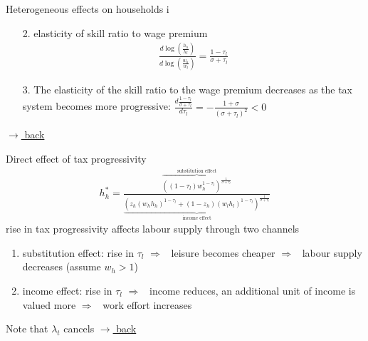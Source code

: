 \documentclass[11pt,aspectratio=169]{beamer}
\newcommand{\ar}{$\Rightarrow$ \ }
\begin{document}
\begin{frame}{Heterogeneous effects on households i}

	\begin{enumerate}
		\item[2.] elasticity of skill ratio to wage premium
		\begin{align*}
		\frac{d\log\left(\frac{h_h}{h_l}\right)}{d\log\left(\frac{w_h}{w_l}\right)}=\frac{1-\tau_l}{\sigma +\tau_l}
		\end{align*}
		\item[3.]
		The elasticity of the skill ratio to the wage premium decreases as the tax system becomes more progressive: $\frac{d\frac{1-\tau_l}{\sigma+\tau_l}}{d \tau_l}=-\frac{1+\sigma}{(\sigma+\tau_l)^2}<0$
	\end{enumerate}
\vspace{0mm}
\hfill
\hyperlink{backhh}{\tiny{$\rightarrow$ back}}
\end{frame}
\begin{frame}[shrink]{Direct effect of tax progressivity}	\hypertarget{opth}{}
\vspace{-9mm}
\begin{align*}
h_h^*=\frac{\overbrace{\left((1-\tau_l)w_h^{1-\tau_l}\right)^{\frac{1}{\sigma+\tau_l}}}^{\text{substitution effect}}}{\underbrace{\left(z_h(w_hh_h)^{1-\tau_l}+(1-z_h)(w_lh_l)^{1-\tau_l}\right)^{\frac{1}{\sigma+\tau_l}}}_{\text{income effect}}}
		\end{align*}
		rise in tax progressivity affects labour supply through two channels
		\begin{enumerate}			
			\item substitution effect: rise in $\tau_l$ \ar leisure becomes cheaper \ar labour supply decreases (assume $w_h>1$)
			\item income effect: rise in $\tau_l$ \ar income reduces, an additional unit of income is valued more \ar work effort increases
			\end{enumerate}
	 
 Note that $\lambda_t$ cancels
 \vspace{-8mm}
 \hfill
 \hyperlink{backhh}{\tiny{$\rightarrow$ back}}
\end{frame}
\end{document}
